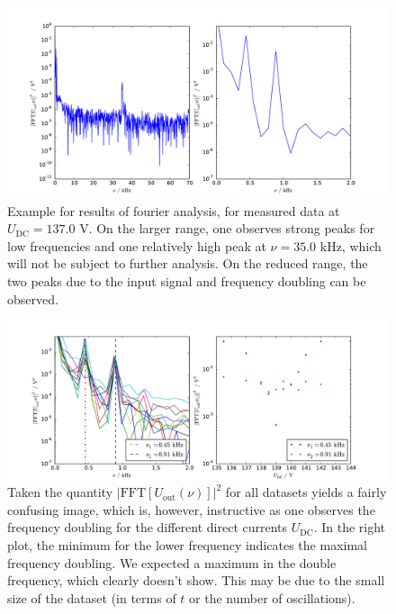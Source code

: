 \begin{figure}
\includegraphics[width=\textwidth]{figures/fft_example.pdf}
\caption{
    Example for results of fourier analysis, for measured data at 
    $U_\mathrm{DC} = 137.0$ V.
    On the larger range, one observes strong peaks for low frequencies 
    and one relatively high peak at $\nu = 35.0$ kHz, which will not be 
    subject to further analysis. On the reduced range, the two peaks 
    due to the input signal and frequency doubling can be observed. 
    }
\label{fig:fft_example}
\end{figure}

\begin{figure}
\includegraphics[width=1.0\textwidth]{figures/fft_all.pdf}
\caption{
    Taken the quantity
    $|\mathrm{FFT}\left[U_\mathrm{out} \left(\nu\right)\right]|^2$ 
    for all datasets yields a fairly confusing image, 
    which is, however, instructive as one observes the 
    frequency doubling for the different direct currents 
    $U_\mathrm{DC}$.
    In the right plot, the minimum for the lower frequency indicates 
    the maximal frequency doubling. We expected a maximum in the 
    double frequency, which clearly doesn't show. This 
    may be due to the small size of the dataset (in terms 
        of $t$ or the number of oscillations). 
    }
\label{fig:fft_all}
\end{figure}

